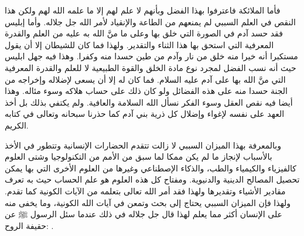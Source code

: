فأما الملائكة فاعترفوا بهذا الفضل وبأنهم لا علم لهم إلا ما علمه الله لهم ولكن هذا النقص في العلم السببي لم يمنعهم من الطاعة والإنقياد لأمر الله جل جلاله. وأما إبليس فقد حسد آدم في الصورة التي خلق بها وعلى ما منَّ الله به عليه من العلم والقدرة المعرفية التي استحق بها هذا الثناء والتقدير. ولهذا فما كان للشيطان إلا أن يقول مستكبرا أنه خيرا منه خلق من نار وآدم من طين حسدا منه وكفرا. وهذا فيه جهل ابليس حيث أنه نسب الفضل لمجرد نوع مادة الخلق والقوة الطبيعية لا للعلم والقدرة المعرفية التي منَّ الله بها على آدم عليه السلام. فما كان له إلا أن يسعى لإضلاله وإخراجه من الجنة حسدا منه على هذه الفضائل ولو كان ذلك على حساب هلاكه وسوء مئاله. وهذا أيضا فيه نقص العقل وسوء الفكر نسأل الله السلامة والعافية. ولم يكتفي بذلك بل أخذ العهد على نفسه لإغواء وإضلال كل ذرية بني آدم كما حذرنا سبحانه وتعالى في كتابه الكريم.

وبالمعرفة بهذا الميزان السببي لا زالت تتقدم الحضارات الإنسانية وتتطور في الأخذ بالأسباب لإنجاز ما لم يكن ممكا لما سبق من الأمم من التكنولوجيا وشتى العلوم كالفيزياء والكيمياء والطب، والذكاء الإصطناعي وغيرها من العلوم الأخرى التي بها يمكن تحصيل المصالح الدينية والدنيوية. ومفتاح كل هذه العلوم هو علم الحساب حيث به تعرف مقادير الأشياء وتقديرها ولهذا فقد أمر الله تعالى بتعلمه من الآيات الكونية كما تقدم. ولهذا فإن الميزان السببي يحتاج إلى بحث وتمعن في آيات الله الكونية، وما يخفى منه على الإنسان أكثر مما يعلم لهذا قال جل جلاله في ذلك عندما سئل الرسول ﷺ عن حقيفة الروح: 
\quranayah*[17][85]{\footnotesize \surahname*[17]}.

